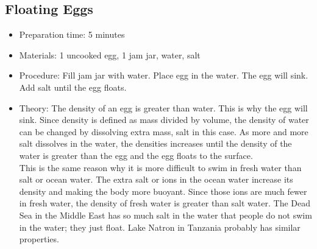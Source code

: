 \subsection{Floating Eggs}
\begin{itemize}
\item{Preparation time: 5 minutes}
\item{Materials: 1 uncooked egg, 1 jam jar, water, salt}
\item{Procedure: Fill jam jar with water. Place egg in the water. The egg will sink. Add salt until the egg floats.}
\item{Theory: The density of an egg is greater than water. This is why the egg will sink. Since density is defined as mass divided by volume, the density of water can be changed by dissolving extra mass, salt in this case. As more and more salt dissolves in the water, the densities increases until the density of the water is greater than the egg and the egg floats to the surface.\\
This is the same reason why it is more difficult to swim in fresh water than salt or ocean water. The extra salt or ions in the ocean water increase its density and making the body more buoyant. Since those ions are much fewer in fresh water, the density of fresh water is greater than salt water. The Dead Sea in the Middle East has so much salt in the water that people do not swim in the water; they just float. Lake Natron in Tanzania probably has similar properties.}
\end{itemize}

